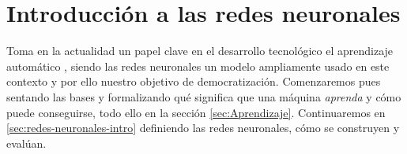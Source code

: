 
\chapter{Introducción a las redes neuronales} 

Toma en la actualidad un papel clave en el desarrollo tecnológico el aprendizaje automático
\cite{importancia-arte-aprendizaje-automatico}, siendo 
las redes neuronales un modelo ampliamente usado en este contexto y por ello 
nuestro objetivo de democratización. 
Comenzaremos pues  sentando las bases y 
formalizando 
qué significa 
que una máquina \textit{aprenda}  y cómo puede conseguirse, 
todo ello en la sección \ref{sec:Aprendizaje}.
Continuaremos en \ref{sec:redes-neuronales-intro} 
definiendo las redes neuronales, cómo se construyen y evalúan. 
